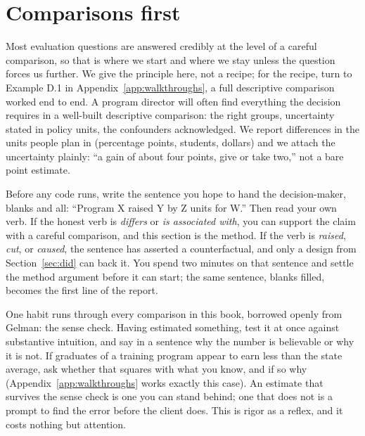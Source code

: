\documentclass[
    a4paper,
    fontsize=10pt,
    twoside=true,
    numbers=noenddot,
]{kaobook}
\begin{document}
\section{Comparisons first}\label{sec:comparisons}
Most evaluation questions are answered credibly at the level of a careful comparison, so that is where we start and where we stay unless the question forces us further. We give the principle here, not a recipe; for the recipe, turn to Example D.1 in Appendix~\ref{app:walkthroughs}, a full descriptive comparison worked end to end. A program director will often find everything the decision requires in a well-built descriptive comparison: the right groups, uncertainty stated in policy units, the confounders acknowledged. We report differences in the units people plan in (percentage points, students, dollars) and we attach the uncertainty plainly: \enquote{a gain of about four points, give or take two,} not a bare point estimate.

Before any code runs, write the sentence you hope to hand the decision-maker, blanks and all: \enquote{Program X raised Y by Z units for W.} Then read your own verb. If the honest verb is \emph{differs} or \emph{is associated with}, you can support the claim with a careful comparison, and this section is the method. If the verb is \emph{raised}, \emph{cut}, or \emph{caused}, the sentence has asserted a counterfactual, and only a design from Section~\ref{sec:did} can back it. You spend two minutes on that sentence and settle the method argument before it can start; the same sentence, blanks filled, becomes the first line of the report.

One habit runs through every comparison in this book, borrowed openly from Gelman: the sense check. Having estimated something, test it at once against substantive intuition, and say in a sentence why the number is believable or why it is not. If graduates of a training program appear to earn less than the state average, ask whether that squares with what you know, and if so why (Appendix~\ref{app:walkthroughs} works exactly this case). An estimate that survives the sense check is one you can stand behind; one that does not is a prompt to find the error before the client does. This is rigor as a reflex, and it costs nothing but attention.
\end{document}
